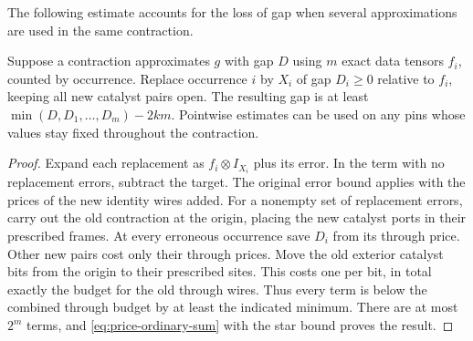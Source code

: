 The following estimate accounts for the loss of gap when several
approximations are used in the same contraction.
\begin{lemma}[Substitution]\label{lem:substitution}
Suppose a contraction approximates $g$ with gap $D$ using $m$ exact data
tensors $f_i$, counted by occurrence. Replace occurrence $i$ by
$X_i$ of gap $D_i\ge0$ relative to $f_i$, keeping all new catalyst pairs
open. The resulting gap is at least
$\min(D,D_1,\ldots,D_m)-2km$. Pointwise estimates can be used on any pins
whose values stay fixed throughout the contraction.
\end{lemma}
\begin{proof}
Expand each replacement as $f_i\otimes I_{X_i}$ plus its error. In the term
with no replacement errors, subtract the target. The original error bound
applies with the prices of the new identity wires added. For a nonempty set of
replacement errors, carry out the old contraction at the origin, placing the
new catalyst ports in their prescribed frames. At every erroneous occurrence
save $D_i$ from its through price. Other new pairs cost only their through
prices. Move the old exterior catalyst bits from the origin to their
prescribed sites. This costs one per bit, in total exactly the budget for the
old through wires. Thus every term is below the combined through budget by at
least the indicated minimum. There are at most $2^m$ terms, and
\eqref{eq:price-ordinary-sum} with the star bound proves the result.
\end{proof}
